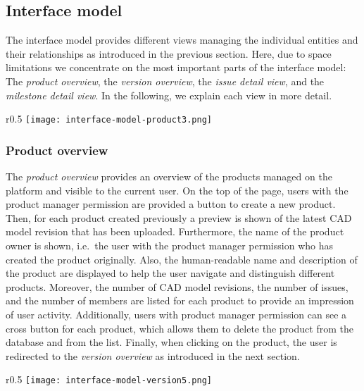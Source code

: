 \subsection{Interface model}

The interface model provides different views managing the individual entities and their relationships as introduced in the previous section.
Here, due to space limitations we concentrate on the most important parts of the interface model: The \textit{product overview}, the \textit{version overview}, the \textit{issue detail view}, and the \textit{milestone detail view}.
In the following, we explain each view in more detail.

\begin{wrapfigure}{r}{0.5\textwidth}
    \centering
    \texttt{[image: interface-model-product3.png]}
    \label{fig:screenshot-product}
\end{wrapfigure}

\subsubsection{Product overview}

The \textit{product overview} provides an overview of the products managed on the platform and visible to the current user.
On the top of the page, users with the product manager permission are provided a button to create a new product.
Then, for each product created previously a preview is shown of the latest CAD model revision that has been uploaded.
Furthermore, the name of the product owner is shown, i.e.\ the user with the product manager permission who has created the product originally.
Also, the human-readable name and description of the product are displayed to help the user navigate and distinguish different products.
Moreover, the number of CAD model revisions, the number of issues, and the number of members are listed for each product to provide an impression of user activity.
Additionally, users with product manager permission can see a cross button for each product, which allows them to delete the product from the database and from the list.
Finally, when clicking on the product, the user is redirected to the \textit{version overview} as introduced in the next section.

\begin{wrapfigure}{r}{0.5\textwidth}
    \centering
    \texttt{[image: interface-model-version5.png]}
    \label{fig:screenshot-version}
\end{wrapfigure}

